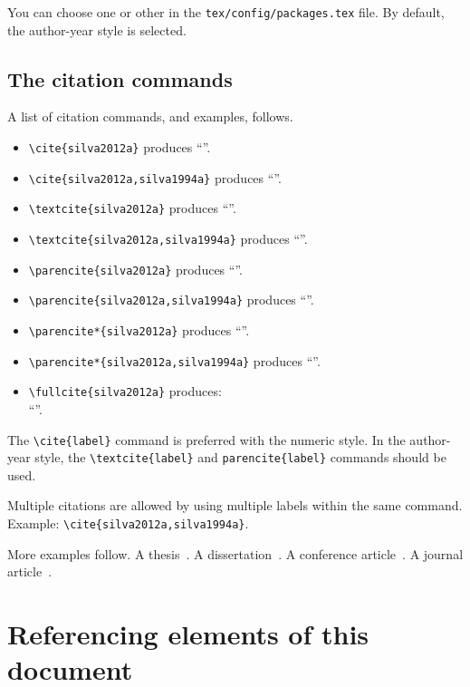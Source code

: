 You can choose one or other in the \verb+tex/config/packages.tex+ file. By default, the author-year style is selected.

\subsection{The citation commands}
\label{c3:ss:the-citation-commands}

A list of citation commands, and examples, follows.

\begin{itemize}
\item
\verb+\cite{silva2012a}+ produces ``\cite{silva2012a}''.
\item
\verb+\cite{silva2012a,silva1994a}+ produces ``\cite{silva2012a,silva1994a}''.
\item
\verb+\textcite{silva2012a}+ produces ``\textcite{silva2012a}''.
\item
\verb+\textcite{silva2012a,silva1994a}+ produces ``\textcite{silva2012a,silva1994a}''.
\item
\verb+\parencite{silva2012a}+ produces ``\parencite{silva2012a}''.
\item
\verb+\parencite{silva2012a,silva1994a}+ produces ``\parencite{silva2012a,silva1994a}''.
\item
\verb+\parencite*{silva2012a}+ produces ``\parencite*{silva2012a}''.
\item
\verb+\parencite*{silva2012a,silva1994a}+ produces ``\parencite*{silva2012a,silva1994a}''.
\item
\verb+\fullcite{silva2012a}+ produces:\\``''.
\end{itemize}

The \verb+\cite{label}+ command is preferred with the numeric style. In the author-year style, the \verb+\textcite{label}+ and \verb+parencite{label}+ commands should be used.

Multiple citations are allowed by using multiple labels within the same command. Example: \verb+\cite{silva2012a,silva1994a}+.

More examples follow. A  thesis~\parencite{silva1994a}. A  dissertation~\parencite{antunes2015a}. A conference article~\parencite{antunes2020a}. A journal article~\parencite{antunes2019a}.

\section{Referencing elements of this document}
\label{c3:s:referencing-elements-of-this-document}

